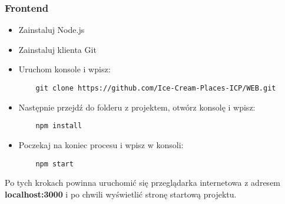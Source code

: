 \documentclass{article}
\begin{document}
            \subsubsection{Frontend}
            \begin{itemize}
                \item Zainstaluj Node.js
                \item Zainstaluj klienta Git
                \item Uruchom konsole i wpisz:
                \begin{lstlisting}
    git clone https://github.com/Ice-Cream-Places-ICP/WEB.git
                \end{lstlisting}
                \item Następnie przejdź do folderu z projektem, otwórz konsolę i wpisz:
                \begin{lstlisting}
    npm install
                \end{lstlisting}
                \item Poczekaj na koniec procesu i wpisz w konsoli:
                \begin{lstlisting}
    npm start
                \end{lstlisting}
            \end{itemize}
            Po tych krokach powinna uruchomić się przeglądarka internetowa z adresem \textbf{localhost:3000} i po chwili wyświetlić stronę startową projektu.
\end{document}
